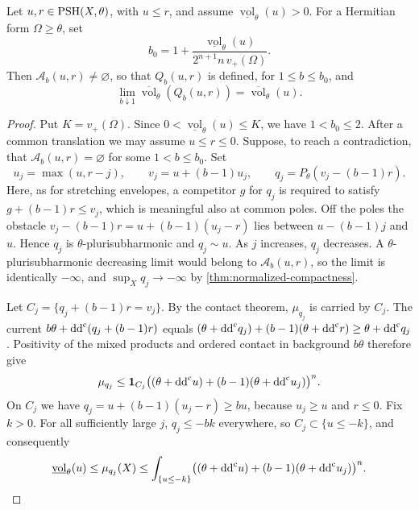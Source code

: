 \begin{lemma}\label{lem:positive-volume-stretch}
Let $u,r\in\mathrm{PSH}(X,\theta)$, with $u\leq r$, and assume
$\underline{\operatorname{vol}}_\theta(u)>0$. For a Hermitian form $\Omega\geq\theta$, set
\[
 b_0=1+\frac{\underline{\operatorname{vol}}_\theta(u)}
                   {2^{n+1}n\,v_+(\Omega)}.
\]
Then $\mathcal A_b(u,r)\neq\varnothing$, so that $Q_b(u,r)$ is defined, for $1\leq b\leq b_0$, and
\[
 \lim_{b\downarrow1}\overline{\operatorname{vol}}_\theta(Q_b(u,r))
 =\overline{\operatorname{vol}}_\theta(u).
\]
\end{lemma}
\begin{proof}
Put $K=v_+(\Omega)$. Since $0<\underline{\operatorname{vol}}_\theta(u)\leq K$, we have $1<b_0\leq2$. After a common translation we may assume $u\leq r\leq0$. Suppose, to reach a contradiction, that $\mathcal A_b(u,r)=\varnothing$ for some $1<b\leq b_0$. Set
\[
 u_j=\max(u,r-j),\qquad v_j=u+(b-1)u_j,
 \qquad q_j=P_\theta(v_j-(b-1)r).
\]
Here, as for stretching envelopes, a competitor $g$ for $q_j$ is required to satisfy $g+(b-1)r\leq v_j$, which is meaningful also at common poles. Off the poles the obstacle $v_j-(b-1)r=u+(b-1)(u_j-r)$ lies between $u-(b-1)j$ and $u$. Hence $q_j$ is $\theta$-plurisubharmonic and $q_j\sim u$. As $j$ increases, $q_j$ decreases. A $\theta$-plurisubharmonic decreasing limit would belong to $\mathcal A_b(u,r)$, so the limit is identically $-\infty$, and $\sup_Xq_j\to-\infty$ by \cref{thm:normalized-compactness}.

Let $C_j=\{q_j+(b-1)r=v_j\}$. By the contact theorem, $\mu_{q_j}$ is carried by $C_j$. The current $b\theta+\mathrm{dd}^{\mathrm{c}}(q_j+(b-1)r)$ equals $(\theta+\mathrm{dd}^{\mathrm{c}} q_j)+(b-1)(\theta+\mathrm{dd}^{\mathrm{c}} r)\geq\theta+\mathrm{dd}^{\mathrm{c}} q_j$. Positivity of the mixed products and ordered contact in background $b\theta$ therefore give
\[
 \mu_{q_j}\leq\mathbf1_{C_j}\bigl((\theta+\mathrm{dd}^{\mathrm{c}} u)+(b-1)(\theta+\mathrm{dd}^{\mathrm{c}} u_j)\bigr)^n.
\]
On $C_j$ we have $q_j=u+(b-1)(u_j-r)\geq bu$, because $u_j\geq u$ and $r\leq0$. Fix $k>0$. For all sufficiently large $j$, $q_j\leq-bk$ everywhere, so $C_j\subset\{u\leq-k\}$, and consequently
\begin{equation}\label{eq:positive-volume-stretch-tail}
 \underline{\operatorname{vol}}_\theta(u)
 \leq\mu_{q_j}(X)
 \leq\int_{\{u\leq-k\}}\bigl((\theta+\mathrm{dd}^{\mathrm{c}} u)+(b-1)(\theta+\mathrm{dd}^{\mathrm{c}} u_j)\bigr)^n.
\end{equation}


\end{proof}

